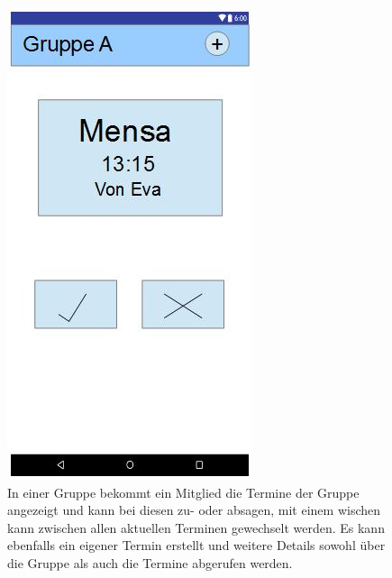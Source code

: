 \documentclass{scrartcl}
\begin{document}
	\newpage
	\begin{figure}[h]
		\centering
		\includegraphics[width=.5\textwidth]{GUI_Gruppe.jpg}
		\caption{In einer Gruppe bekommt ein  Mitglied die Termine der Gruppe angezeigt und kann bei diesen zu- oder absagen, mit einem wischen kann zwischen allen aktuellen Terminen gewechselt werden. Es kann ebenfalls ein eigener Termin erstellt und weitere Details sowohl über die Gruppe als auch die Termine abgerufen werden.}
	\end{figure}
	
\end{document}

